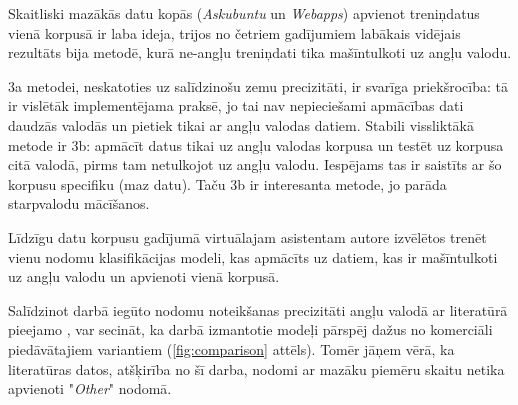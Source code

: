 Skaitliski mazākās datu kopās (\textit{Askubuntu} un \textit{Webapps}) apvienot treniņdatus vienā korpusā ir laba ideja, trijos no četriem gadījumiem labākais vidējais rezultāts bija metodē, kurā ne-angļu treniņdati tika mašīntulkoti uz angļu valodu.  

3a metodei, neskatoties uz salīdzinošu zemu precizitāti, ir svarīga priekšrocība: tā ir vislētāk implementējama praksē, jo tai nav nepieciešami apmācības dati daudzās valodās un pietiek tikai ar angļu valodas datiem. Stabili vissliktākā metode ir 3b: apmācīt datus tikai uz angļu valodas korpusa un testēt uz korpusa citā valodā, pirms tam netulkojot uz angļu valodu. Iespējams tas ir saistīts ar šo korpusu specifiku (maz datu). Taču 3b ir interesanta metode, jo parāda starpvalodu mācīšanos.

Līdzīgu datu korpusu gadījumā virtuālajam asistentam autore izvēlētos trenēt vienu nodomu klasifikācijas modeli, kas apmācīts uz datiem, kas ir mašīntulkoti uz angļu valodu un apvienoti vienā korpusā.


Salīdzinot darbā iegūto nodomu noteikšanas precizitāti angļu valodā ar literatūrā pieejamo \cite{fasttext2019}, var secināt, ka darbā izmantotie modeļi pārspēj dažus no komerciāli piedāvātajiem variantiem (\ref{fig:comparison} attēls). Tomēr jāņem vērā, ka literatūras datos, atšķirība no šī darba, nodomi ar mazāku piemēru skaitu netika apvienoti "\textit{Other}" nodomā.







